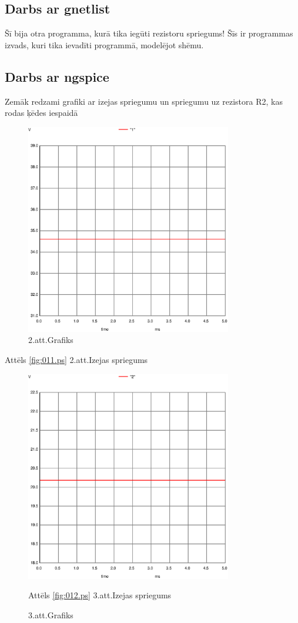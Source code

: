 \documentclass{report}
\begin{document}
{\subsection{Darbs ar gnetlist}
Šī bija otra programma, kurā tika iegūti rezistoru spriegums! Šīs ir programmas izvads, kuri tika ievadīti programmā, modelējot shēmu.


\subsection{Darbs ar ngspice}
Zemāk redzami grafiki ar izejas spriegumu un spriegumu uz rezistora R2, kas rodas ķēdes iespaidā

\begin{figure}[!H]
\begin{center}
\includegraphics[width=9cm]{011.ps}
\caption{2.att.Grafiks}
\label{fig:01.ps}
\end{center}
\end{figure}
Attēls \ref{fig:011.ps} 2.att.Izejas spriegums

\begin{figure}[!t]
\begin{center}
\includegraphics[width=9cm]{012.ps}
\caption{3.att.Grafiks}
\label{fig:01.ps}
Attēls \ref{fig:012.ps} 3.att.Izejas spriegums
\end{center}
\end{figure}

}
\end{document}
